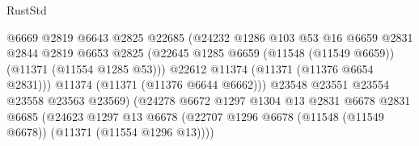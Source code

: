 \begin{lexlean}{RustStd}
\begin{coremodule}
                                            @6669
                                            @2819
                                            @6643
                                            @2825
                                            @22685
                                            (@24232
                                              @1286
                                              @103
                                              @53
                                              @16
                                              @6659
                                              @2831
                                              @2844
                                              @2819
                                              @6653
                                              @2825
                                              (@22645
                                                @1285
                                                @6659
                                                (@11548 (@11549 @6659))
                                                (@11371 (@11554 @1285 @53)))
                                              @22612
                                              @11374
                                              (@11371 (@11376 @6654 @2831)))
                                            @11374
                                            (@11371 (@11376 @6644 @6662)))
                                          @23548
                                          @23551
                                          @23554
                                          @23558
                                          @23563
                                          @23569)
                                        (@24278
                                          @6672
                                          @1297
                                          @1304
                                          @13
                                          @2831
                                          @6678
                                          @2831
                                          @6685
                                          (@24623
                                            @1297
                                            @13
                                            @6678
                                            (@22707
                                              @1296
                                              @6678
                                              (@11548 (@11549 @6678))
                                              (@11371 (@11554 @1296 @13))))

\end{coremodule}
\end{lexlean}
